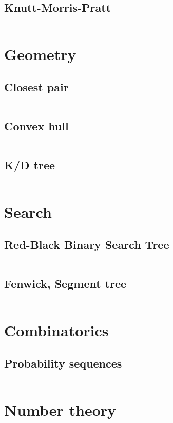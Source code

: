 \documentclass[8pt,a4paper,landscape,oneside]{amsart}
\newcommand{\code}[1]{\inputminted[fontsize=\normalsize,baselinestretch=1]{python}{code/#1}}
\begin{document}
\begin{multicols*}{3}
    \subsection{Knutt-Morris-Pratt}
        \code{helloworld.py}

\section{Geometry}

    \subsection{Closest pair}
        \code{helloworld.py}
    \subsection{Convex hull}
        \code{helloworld.py}
    \subsection{K/D tree}
        \code{helloworld.py}

\section{Search}

    \subsection{Red-Black Binary Search Tree}
        \code{helloworld.py}
    \subsection{Fenwick, Segment tree}
        \code{helloworld.py}

\section{Combinatorics}

    \subsection{Probability sequences}
        \code{helloworld.py}

\section{Number theory}


\end{multicols*}
\end{document}

